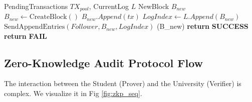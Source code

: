 \documentclass[conference]{IEEEtran}
\renewcommand{\RETURN}{\STATE \textbf{return} }
\begin{document}
\begin{algorithm}[H]
\caption{Raft Consensus Validation (Leader Node)}
\begin{algorithmic}[1]
\REQUIRE PendingTransactions $TX_{pool}$, CurrentLog $L$
\ENSURE NewBlock $B_{new}$
\STATE $B_{new} \leftarrow \text{CreateBlock}()$
        \STATE $B_{new}.Append(tx)$
    \ENDIF
\ENDFOR
\STATE $LogIndex \leftarrow L.Append(B_{new})$
    \STATE $\text{SendAppendEntries}(Follower, B_{new}, LogIndex)$
\ENDFOR
{}
    \STATE {}(B_{new})
    \RETURN \textbf{SUCCESS}
\ELSE
    \RETURN \textbf{FAIL}
\ENDIF
\end{algorithmic}
\end{algorithm}

\subsection{Zero-Knowledge Audit Protocol Flow}
The interaction between the Student (Prover) and the University (Verifier) is complex. We visualize it in Fig \ref{fig:zkp_seq}.
\end{document}
